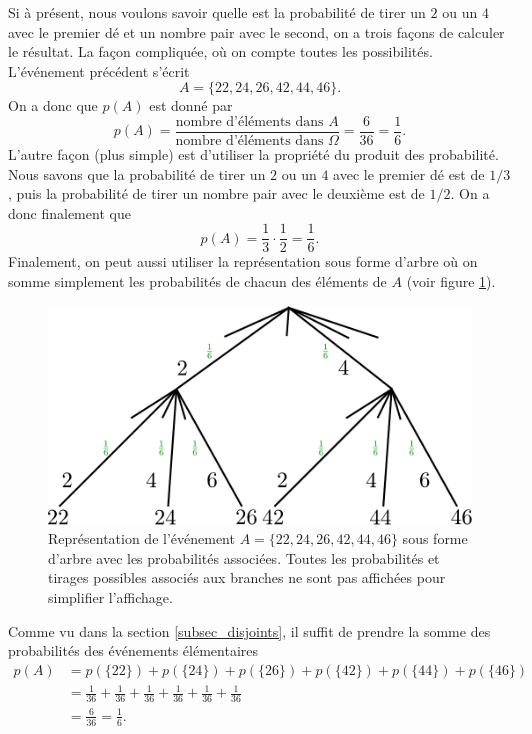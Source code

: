 \documentclass[a4paper,12pt]{book}
\begin{document}
Si à présent, nous voulons savoir quelle est la probabilité de tirer un $2$ ou un $4$ avec le premier dé et un nombre pair avec le second,
on a trois façons de calculer le résultat. La façon compliquée, où on compte toutes les possibilités. L'événement 
précédent s'écrit
\begin{equation}
 A=\{22,24,26,42,44,46\}.
\end{equation}
On a donc que $p(A)$ est donné par
\begin{equation}
 p(A)=\frac{\mbox{nombre d'éléments dans }A}{\mbox{nombre d'éléments dans }\Omega}=\frac{6}{36}=\frac{1}{6}.
\end{equation}
L'autre façon (plus simple) est d'utiliser la propriété du produit des probabilité. Nous savons que la probabilité de tirer un 
$2$ ou un $4$ avec le premier dé est de $1/3$, puis la probabilité de tirer un nombre pair avec le deuxième est de 
$1/2$. On a donc finalement que
\begin{equation}
 p(A)=\frac{1}{3}\cdot\frac{1}{2}=\frac{1}{6}.
\end{equation}
Finalement, on peut aussi utiliser la représentation sous forme d'arbre
où on somme simplement les probabilités de chacun des éléments de $A$
(voir figure \ref{fig_arbre3}).
\begin{figure}[htp]
\includegraphics[width=\textwidth]{figs/arbre3.pdf}
\caption{Représentation de l'événement $A=\{22,24,26,42,44,46\}$ sous forme d'arbre avec les probabilités associées.
Toutes les probabilités et tirages possibles associés aux branches ne sont pas affichées pour simplifier
l'affichage.}\label{fig_arbre3}
\end{figure}
Comme vu dans la section \ref{subsec_disjoints}, il suffit de prendre la somme des 
probabilités des événements élémentaires
\begin{align}
 p(A)&=p(\{22\})+p(\{24\})+p(\{26\})+p(\{42\})+p(\{44\})+p(\{46\})\nonumber\\
     &=\frac{1}{36}+\frac{1}{36}+\frac{1}{36}+\frac{1}{36}+\frac{1}{36}+\frac{1}{36}\nonumber\\
     &=\frac{6}{36}=\frac{1}{6}.
\end{align}
\end{document}
